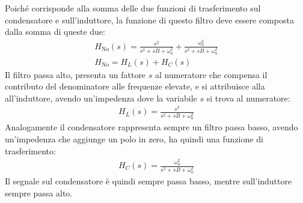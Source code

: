 \documentclass{article}
\numberwithin{equation}{subsection}
\begin{document}
Poiché corrisponde alla somma delle due funzioni di trasferimento sul condensatore e sull'induttore, la funzione di questo filtro deve 
essere composta dalla somma di queste due:
\begin{gather*}
    H_{\mathrm{\mathrm{No}}}(s)=\displaystyle\frac{s^2}{s^2+sB+\omega_0^2}+\frac{\omega_0^2}{s^2+sB+\omega_0^2}\\
    H_{\mathrm{\mathrm{No}}}=H_L(s)+H_C(s)
\end{gather*}
Il filtro passa alto, presenta un fattore $s$ al numeratore che compensa il contributo del denominatore alle frequenze elevate, e si attribuisce alla 
all'induttore, avendo un'impedenza dove la variabile $s$ si trova al numeratore: 
\begin{gather*}
    H_L(s)=\displaystyle\frac{s^2}{s^2+sB+\omega_0^2}
\end{gather*}
Analogamente il condensatore rappresenta sempre un filtro passa basso, avendo un'impedenza che aggiunge un polo in zero, ha quindi una funzione 
di trasferimento:
\begin{gather*}
    H_C(s)=\displaystyle\frac{\omega_0^2}{s^2+sB+\omega_0^2}
\end{gather*}
Il segnale sul condensatore è quindi sempre passa basso, mentre sull'induttore sempre passa alto. 
\end{document}
